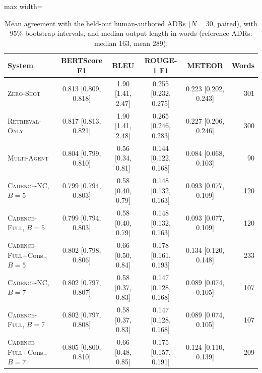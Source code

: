 \documentclass[preprint,12pt,authoryear]{elsarticle}
\newcommand{\sysZS}{\textsc{Zero-Shot}}
\newcommand{\sysRO}{\textsc{Retrieval-Only}}
\newcommand{\sysMA}{\textsc{Multi-Agent}}
\newcommand{\sysNC}{\textsc{Cadence-NC}}
\newcommand{\sysFull}{\textsc{Cadence-Full}}
\renewcommand{\_}{\textunderscore\allowbreak{}}
\begin{document}
\begin{table}[!htbp]
\caption{Mean agreement with the held-out human-authored ADRs ($N=30$, paired), with 95\% bootstrap intervals, and median output length in words (reference ADRs: median 163, mean 289).\label{tab:rq1-means}}
\centering
\begin{adjustbox}{max width=\textwidth}
\begin{tabular}{@{}lccccr@{}}
\toprule
System & BERTScore F1 & BLEU & ROUGE-1 F1 & METEOR & Words \\
\midrule
\sysZS{}  & 0.813 {\tiny[0.809, 0.818]} & 1.90 {\tiny[1.41, 2.47]} & 0.255 {\tiny[0.232, 0.275]} & 0.223 {\tiny[0.202, 0.243]} & 301 \\
\sysRO{}  & 0.817 {\tiny[0.813, 0.821]} & 1.90 {\tiny[1.41, 2.48]} & 0.265 {\tiny[0.246, 0.283]} & 0.227 {\tiny[0.206, 0.246]} & 300 \\
\sysMA{}  & 0.804 {\tiny[0.799, 0.810]} & 0.56 {\tiny[0.34, 0.81]} & 0.144 {\tiny[0.122, 0.168]} & 0.084 {\tiny[0.068, 0.103]} & 90 \\
\midrule
\sysNC{}, $B=5$  & 0.799 {\tiny[0.794, 0.803]} & 0.58 {\tiny[0.40, 0.79]} & 0.148 {\tiny[0.132, 0.163]} & 0.093 {\tiny[0.077, 0.109]} & 120 \\
\sysFull{}, $B=5$  & 0.799 {\tiny[0.794, 0.803]} & 0.58 {\tiny[0.40, 0.79]} & 0.148 {\tiny[0.132, 0.163]} & 0.093 {\tiny[0.077, 0.109]} & 120 \\
\sysFull{}+Cons., $B=5$  & 0.802 {\tiny[0.798, 0.806]} & 0.66 {\tiny[0.50, 0.84]} & 0.178 {\tiny[0.161, 0.193]} & 0.134 {\tiny[0.120, 0.148]} & 233 \\
\midrule
\sysNC{}, $B=7$  & 0.802 {\tiny[0.797, 0.807]} & 0.58 {\tiny[0.37, 0.83]} & 0.147 {\tiny[0.128, 0.168]} & 0.089 {\tiny[0.074, 0.105]} & 107 \\
\sysFull{}, $B=7$  & 0.802 {\tiny[0.797, 0.808]} & 0.58 {\tiny[0.37, 0.83]} & 0.147 {\tiny[0.128, 0.168]} & 0.089 {\tiny[0.074, 0.105]} & 107 \\
\sysFull{}+Cons., $B=7$  & 0.805 {\tiny[0.800, 0.810]} & 0.66 {\tiny[0.48, 0.85]} & 0.175 {\tiny[0.157, 0.191]} & 0.124 {\tiny[0.110, 0.139]} & 209 \\
\bottomrule
\end{tabular}
\end{adjustbox}
\end{table}
\end{document}
